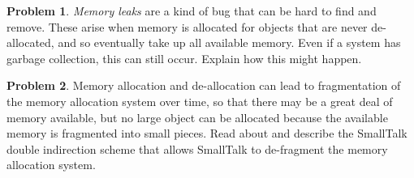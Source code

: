 \documentclass{article}
\theoremstyle{definition}
\newtheorem{problem}{Problem}[subsection]
\begin{document}
	\newpage
	\setcounter{problem}{7}
	\begin{problem}
		\textit{Memory leaks} are a kind of bug that can be hard to find and remove. These arise when memory is allocated for objects that are never de-allocated, and so eventually take up all available memory. Even if a system has garbage collection, this can still occur. Explain how this might happen.
	\end{problem}
	
	\newpage
	\setcounter{problem}{8}
	\begin{problem}
		Memory allocation and de-allocation can lead to fragmentation of the memory
		allocation system over time, so that there may be a great deal of memory available, but no large object can be allocated because the available memory is fragmented into small pieces. Read about and describe the SmallTalk double indirection scheme that allows SmallTalk to de-fragment the memory allocation system.
	\end{problem}
\end{document}
